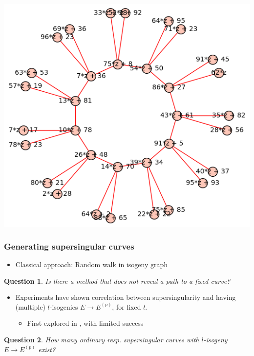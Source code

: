 \documentclass{beamer}
\newtheorem{question}{Question}
\begin{document}
\begin{frame}
{\begin{minipage}{0.49\textwidth}
        \includegraphics[width = \textwidth]{./example_odd_crater.png}
    \end{minipage}}
\end{frame}

\begin{frame}
    \frametitle{Generating supersingular curves}

    \begin{itemize}
        \item Classical approach: Random walk in isogeny graph
    \end{itemize}
    \pause
    \begin{question}
        Is there a method that does not reveal a path to a fixed curve?
    \end{question}
    \pause
    \begin{itemize}
        \item Experiments have shown correlation between supersingularity and having (multiple) $l$-isogenies $E \to E^{(p)}$, for fixed $l$.
        \begin{itemize}
            \item First explored in \cite{base_paper}, with limited success
        \end{itemize}
    \end{itemize}
    \pause
    \begin{question}
        How many ordinary resp. supersingular curves with $l$-isogeny $E \to E^{(p)}$ exist?
    \end{question}
\end{frame}
\end{document}
